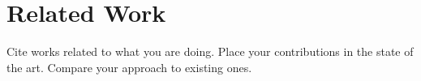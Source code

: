 \chapter{Related Work}
\label{chp:related}

Cite works related to what you are doing. Place your contributions 
in the state of the art. Compare your approach to existing ones.